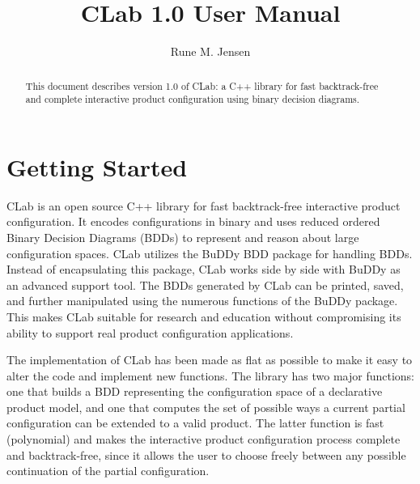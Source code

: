 \documentclass{article}
\begin{document}
\author{Rune M. Jensen}
\title{CLab 1.0 User Manual}

\maketitle

\begin{abstract}
This document describes version 1.0 of CLab: a C++ library
for fast backtrack-free and complete interactive product configuration using
binary decision diagrams. 
\end{abstract}

\tableofcontents

\newpage

\section{Getting Started}

CLab is an open source C++ library for fast backtrack-free
interactive product configuration. It encodes configurations in binary
and uses reduced ordered Binary Decision Diagrams (BDDs) \cite{B86} to
represent and reason about large configuration spaces. CLab utilizes
the BuDDy BDD package
\cite{L99} for handling BDDs. Instead of encapsulating this package, 
CLab works side by side with BuDDy as an advanced support tool. The
BDDs generated by CLab can be printed, saved, and further manipulated
using the numerous functions of the BuDDy package. This makes CLab
suitable for research and education without compromising its ability
to support real product configuration applications.

The implementation of CLab has been made as flat as possible to make
it easy to alter the code and implement new functions. The library
has two major functions: one that builds a BDD representing the
configuration space of a declarative product model, and one that
computes the set of possible ways a current partial configuration can
be extended to a valid product. The latter function is fast
(polynomial) and makes the interactive product configuration process
complete and backtrack-free, since it allows the user to choose freely
between any possible continuation of the partial configuration.
\end{document}
